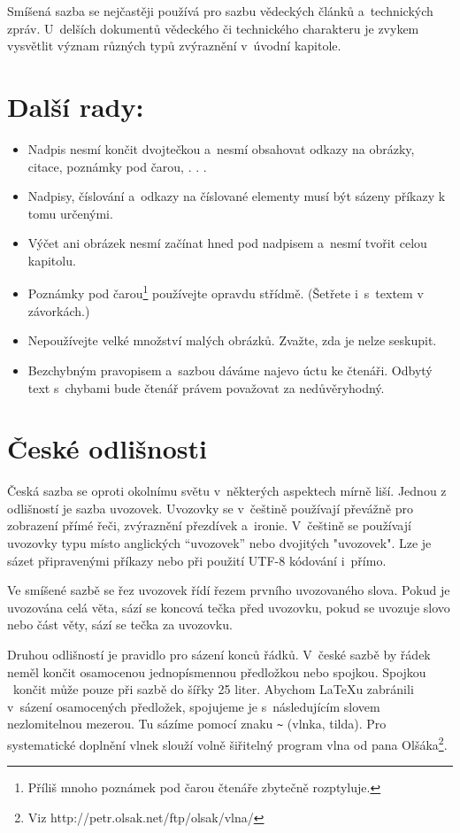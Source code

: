 \documentclass[a4paper, 10pt, twocolumn]{article}
\begin{document}
\par Smíšená sazba se nejčastěji používá pro sazbu vědeckých
článků a~technických zpráv. U~delších dokumentů
vědeckého či technického charakteru je zvykem vysvětlit
význam různých typů zvýraznění v~úvodní kapitole.

\section{Další rady:}

\begin{itemize}
\item Nadpis nesmí končit dvojtečkou a~nesmí obsahovat
odkazy na obrázky, citace, poznámky pod čarou, . . .
\item Nadpisy, číslování a~odkazy na číslované elementy
musí být sázeny příkazy k tomu určenými.
\item Výčet ani obrázek nesmí začínat hned pod nadpisem
a~nesmí tvořit celou kapitolu.
\item Poznámky pod čarou\footnote{Příliš mnoho poznámek pod čarou čtenáře zbytečně rozptyluje.} používejte opravdu střídmě.
(Šetřete i~s~textem v závorkách.)
\item Nepoužívejte velké množství malých obrázků. Zvažte,
zda je nelze seskupit.
\item Bezchybným pravopisem a~sazbou dáváme najevo
úctu ke čtenáři. Odbytý text s~chybami bude čtenář
právem považovat za nedůvěryhodný.
\end{itemize}

\section{České odlišnosti}

Česká sazba se oproti okolnímu světu v~některých aspektech
mírně liší. Jednou z odlišností je sazba uvozovek. Uvozovky
se v~češtině používají převážně pro zobrazení přímé
řeči, zvýraznění přezdívek a~ironie. V~češtině se používají
uvozovky typu  místo anglických “uvozovek” nebo
dvojitých "uvozovek". Lze je sázet připravenými příkazy
nebo při použití UTF-8 kódování i~přímo.

\par Ve smíšené sazbě se řez uvozovek řídí řezem prvního
uvozovaného slova. Pokud je uvozována celá věta, sází se
koncová tečka před uvozovku, pokud se uvozuje slovo nebo
část věty, sází se tečka za uvozovku.

\par Druhou odlišností je pravidlo pro sázení konců řádků.
V~české sazbě by řádek neměl končit osamocenou jednopísmennou
předložkou nebo spojkou. Spojkou ~končit může pouze při sazbě do šířky 25 liter. Abychom \LaTeX{u}
zabránili v~sázení osamocených předložek, spojujeme je s~následujícím slovem {\selectfont nezlomitelnou mezerou}. Tu sázíme pomocí znaku \verb|~| (vlnka, tilda). Pro systematické doplnění vlnek slouží volně šiřitelný program {\selectfont vlna} od pana Olšáka\footnote{{\selectfont Viz http://petr.olsak.net/ftp/olsak/vlna/}}.
\end{document}
